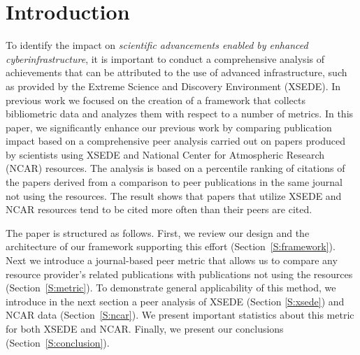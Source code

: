 \documentclass[10pt, conference, compsocconf]{IEEEtran}
\begin{document}

\section{Introduction} 

\cite{las15cluster-long,las15xsede}
To identify the impact on {\em scientific advancements enabled by enhanced cyberinfrastructure}, it is important to conduct a comprehensive analysis of achievements that can be attributed to the use of advanced infrastructure, such as provided by the Extreme Science and Discovery Environment (XSEDE). In previous work \cite{las14impact} we focused on the creation of a framework that collects bibliometric data and analyzes them with respect to a number of metrics. In this paper, we significantly enhance our previous work by comparing publication impact based on a comprehensive peer analysis carried out on papers produced by scientists using XSEDE and National Center for Atmospheric Research (NCAR) resources. The analysis is based on a percentile ranking of citations of the papers derived from a comparison to peer publications in the same journal not using the resources. The result shows that papers that utilize XSEDE and NCAR resources tend to be cited more often than their peers are cited.

The paper is structured as follows. First, we review our design and the architecture of our framework supporting this effort (Section~\ref{S:framework}). Next we introduce a journal-based peer metric that allows us to compare any resource provider's related publications with publications not using the resources (Section~\ref{S:metric}).  To demonstrate general applicability of this method, we introduce in the next section a peer analysis of XSEDE (Section \ref{S:xsede}) and NCAR data (Section~\ref{S:ncar}). We present important statistics about this metric for both XSEDE and NCAR. Finally, we present our conclusions (Section~\ref{S:conclusion}).
\end{document}
